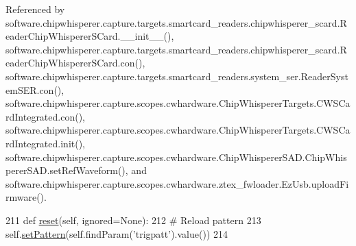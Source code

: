 Referenced by software.\+chipwhisperer.\+capture.\+targets.\+smartcard\+\_\+readers.\+chipwhisperer\+\_\+scard.\+Reader\+Chip\+Whisperer\+S\+Card.\+\_\+\+\_\+init\+\_\+\+\_\+(), software.\+chipwhisperer.\+capture.\+targets.\+smartcard\+\_\+readers.\+chipwhisperer\+\_\+scard.\+Reader\+Chip\+Whisperer\+S\+Card.\+con(), software.\+chipwhisperer.\+capture.\+targets.\+smartcard\+\_\+readers.\+system\+\_\+ser.\+Reader\+System\+S\+E\+R.\+con(), software.\+chipwhisperer.\+capture.\+scopes.\+cwhardware.\+Chip\+Whisperer\+Targets.\+C\+W\+S\+Card\+Integrated.\+con(), software.\+chipwhisperer.\+capture.\+scopes.\+cwhardware.\+Chip\+Whisperer\+Targets.\+C\+W\+S\+Card\+Integrated.\+init(), software.\+chipwhisperer.\+capture.\+scopes.\+cwhardware.\+Chip\+Whisperer\+S\+A\+D.\+Chip\+Whisperer\+S\+A\+D.\+set\+Ref\+Waveform(), and software.\+chipwhisperer.\+capture.\+scopes.\+cwhardware.\+ztex\+\_\+fwloader.\+Ez\+Usb.\+upload\+Firmware().


\begin{DoxyCode}
211     \textcolor{keyword}{def }\hyperlink{classsoftware_1_1chipwhisperer_1_1capture_1_1scopes_1_1cwhardware_1_1ChipWhispererDigitalPattern_1_1ChipWhispererDigitalPattern_a684fb499f39d3d240cbeec05237df12b}{reset}(self, ignored=None):
212         \textcolor{comment}{# Reload pattern}
213         self.\hyperlink{classsoftware_1_1chipwhisperer_1_1capture_1_1scopes_1_1cwhardware_1_1ChipWhispererDigitalPattern_1_1ChipWhispererDigitalPattern_ae4e4f0adaa7233b3d750322f5bca55ee}{setPattern}(self.findParam(\textcolor{stringliteral}{'trigpatt'}).value())
214 
\end{DoxyCode}
\hypertarget{classsoftware_1_1chipwhisperer_1_1capture_1_1scopes_1_1cwhardware_1_1ChipWhispererDigitalPattern_1_1ChipWhispererDigitalPattern_aa41093fac252da6b81875536f0f33253}{}
